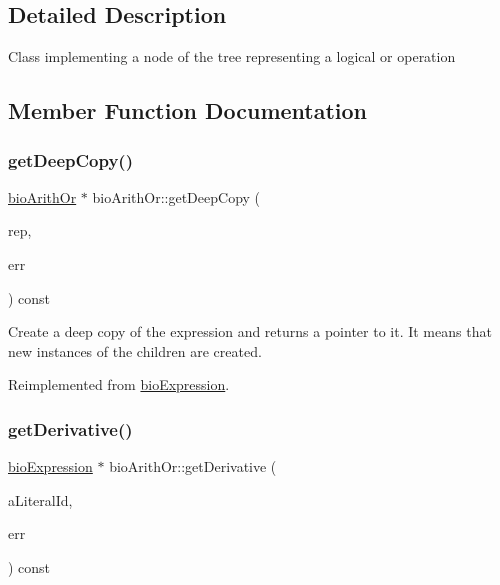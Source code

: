 \subsection{Detailed Description}
Class implementing a node of the tree representing a logical or operation 

\subsection{Member Function Documentation}
\mbox{\label{classbio_arith_or_aad2095426058f90fbb4acaa4ec9bf9fb}} 
\subsubsection{\texorpdfstring{get\+Deep\+Copy()}{getDeepCopy()}}
{\footnotesize\ttfamily \hyperlink{classbio_arith_or}{bio\+Arith\+Or} $\ast$ bio\+Arith\+Or\+::get\+Deep\+Copy (\begin{DoxyParamCaption}\item[{\hyperlink{classbio_expression_repository}{bio\+Expression\+Repository} $\ast$}]{rep,  }\item[{pat\+Error $\ast$\&}]{err }\end{DoxyParamCaption}) const\hspace{0.3cm}{\ttfamily [virtual]}}

Create a deep copy of the expression and returns a pointer to it. It means that new instances of the children are created. 

Reimplemented from \hyperlink{classbio_expression_a4ee1b8add634078a02eaae26cd40dcc8}{bio\+Expression}.

\mbox{\label{classbio_arith_or_a25b8deace8face416cb0cc711799506d}} 
\subsubsection{\texorpdfstring{get\+Derivative()}{getDerivative()}}
{\footnotesize\ttfamily \hyperlink{classbio_expression}{bio\+Expression} $\ast$ bio\+Arith\+Or\+::get\+Derivative (\begin{DoxyParamCaption}\item[{pat\+U\+Long}]{a\+Literal\+Id,  }\item[{pat\+Error $\ast$\&}]{err }\end{DoxyParamCaption}) const\hspace{0.3cm}{\ttfamily [virtual]}}

